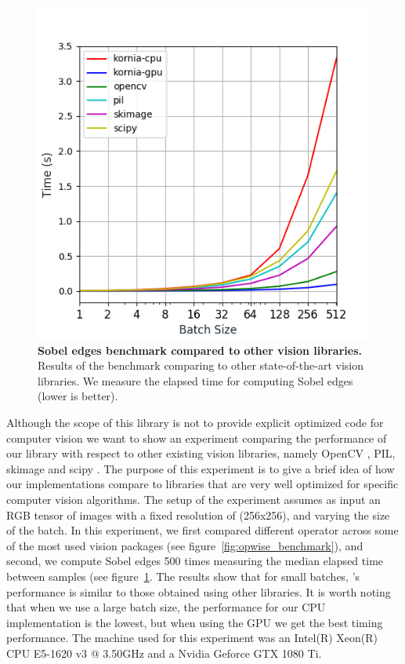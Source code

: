 \begin{figure}[h]
\centering
\includegraphics[width=0.75\linewidth]{main/chapter03/data/benchmark.png}
\caption[Sobel edges benchmark compared to other vision libraries]{{\bf Sobel edges benchmark compared to other vision libraries.} Results of the benchmark comparing \lib{} to other state-of-the-art vision libraries. We measure the elapsed time for computing Sobel edges (lower is better).}
\label{fig:sobel_benchmark}
\end{figure}

Although the scope of this library is not to provide explicit optimized code for computer vision we want to show an experiment comparing the performance of our library with respect to other existing vision libraries, namely OpenCV \citep{opencv}, PIL, skimage \citep{scikit-image} and scipy \citep{scikit-learn}. The purpose of this experiment is to give a brief idea of how our implementations compare to libraries that are very well optimized for specific computer vision algorithms. The setup of the experiment assumes as input an RGB tensor of images with a fixed resolution of (256x256), and varying the size of the batch. In this experiment, we first compared different operator across some of the most used vision packages (see figure~\ref{fig:opwise_benchmark}), and second, we compute Sobel edges 500 times measuring the median elapsed time between samples (see figure~\ref{fig:sobel_benchmark}. The results show that for small batches, \lib's performance is similar to those obtained using  other libraries. It is worth noting that when we use a large batch size, the performance for our CPU implementation is the lowest, but when using the GPU we get the best timing performance. The machine used for this experiment was an Intel(R) Xeon(R) CPU E5-1620 v3 @ 3.50GHz and a Nvidia Geforce GTX 1080 Ti.


